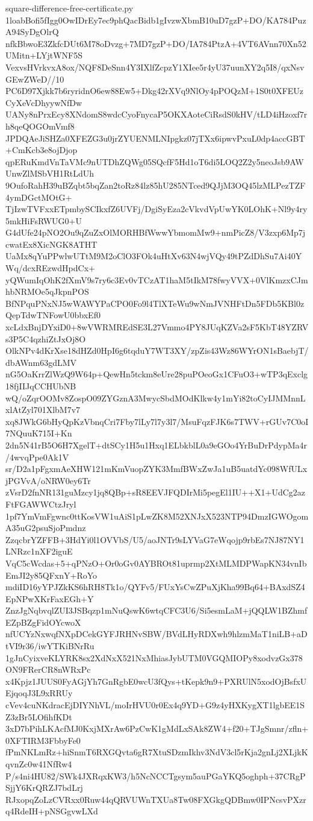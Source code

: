 \documentclass[11pt]{article}
\theoremstyle{definition}
\theoremstyle{remark}
\begin{document}
\begin{filecontents*}[overwrite]{square-difference-free-certificate.py}
1loabBofi5fIgg0OwIDrEy7ec9phQacBidb1gIvzwXbmB10uD7gzP+DO/KA784PuzA94SyDgOlrQ
nfkBbwoE3ZkfcDUt6M78oDvzg+7MD7gzP+DO/IA784PtzA+4VT6AVnn70Xn52UMitn+LYjtWNF5S
VexvsHVrkvxA8ox/NQF8DeSnn4Y3IXlfZcpzY1XIee5r4yU37uunXY2q5I8/qxNsvGEwZWeD//10
PC6D97Xjkk7b6ryridnO6ew88Ew5+Dkg42rXVq9NlOy4pPOQzM+1S0t0XFEUzCyXeVcDhyywNfDw
UANy8nPrxEcy8XNdomS8wdcCyoFnycaP5OKXAoteCiRsdS0kHV/tLD4iHzoxf7rh8qeQOGOmVmf8
JPDQAeJiSHZa0XFEZG3u0jrZYUENMLNIpgkz07jTXx6ipwvPxuL0dp4accGBT+CmKcb3e8ojDjop
qpERuKmdVnTaVMc9nUTDhZQWg05SQcfF5Hd1oT6di5LOQ2Z2y5neoJsb9AWUnwZlMSbVH1RtLdUh
9OufoRahH39uBZqbt5bqZan2toRz84lz85hU285NTced9QJjM3OQ45lzMLPezTZF4ymDGctMOtG+
TjIzwTVFxxETpmbySCIkxfZ6UVFj/DgiSyEza2cVkvdVpUwYK0LOhK+Nl9y4ry5mkHiFsRWUG0+U
G4dUfe24pNO2Ou9qZuZxOlMORHBfWwwYbmomMw9+nmPicZ8/V3zxp6Mp7jcwatEx8XicNGK8ATHT
UaMx8qYuPPwlwUTtM9M2oClO3FOk4uHtXv63N4wjVQy49tPZdDhSu7Ai40YWq/dcxREzwdHpdCx+
yQWumIqOhK2fXmV9s7ry6c3Ev0vTCzAT1haM5tIkM78fwyVVX+0VlKmzxCJmhbNRMOe5qJkpnPOS
BfNPquPNxNJ5wWAWYPaCPO0Fo9l4TlXTeWu9wNmJVNHFtDn5FDb5KBl0zQepTdwTNFowU0bbxEf0
xcLdxBnjDYxiD0+8wVWRMREdSE3L27Vmmo4PY8JUqKZVa2sF5KbT48YZRVs3P5C4qzhiZtJxOj8O
OlkNPv4dKrXse18dHZd0HpI6g6tqduY7WT3XY/zpZis43Wz86WYrON1sBaebjT/dbAWnm63gdLMV
nG5OaKrrZlWzQ9W64p+QewHn5tckm8eUre28puPOeoGx1CFuO3+wTP3qExclg18fjIIJqCCHUbNB
wQ/oZqrOOMv8ZospO09ZYGznA3MwycSbdMOdKlkw4y1mYi82toCyIJMMnnLxlAtZyl701XlbM7v7
xq8JWkG6bHyQpKzVbnqCri7Fby7lLy7l7y3l7/MsuFqzFJK6s7TWV+rGUv7C0oI7NQuuK715I+Kn
2dn5N41rB5O6H7XgelT+dtSCy1H5u1Hxq1ELbkblL0a9eGOo4YrBuDrPdypMa4r/4wvqPpe0Ak1V
sr/D2a1pFgxmAeXHW121mKmVuopZYK3MmfBWxZwJa1uB5uatdYc098WfULxjPGVvA/oNRW0ey6Tr
zVsrD2fnNR131guMzcy1jq8QBp+sR8EEVJFQDIrMi5pegEl1IU++X1+UdCg2azFtFGAWWCtzJryl
1pf7YmVmFgwnc0ttKosVW1uAiS1pLwZK8M52XNJxX523NTP94DmzIGWOgomA35uG2psuSjoPmdnz
ZzqcbrYZFFB+3HdYi0l1OVVbS/U5/aoJNTr9sLYVaG7eWqojp9rbEs7NJ87NY1LNRzc1nXF2iguE
VqC5cWcdas+5+qPNzO+Or0oGv0AYBROt81uprmp2XtMLMDPWapKN34vnIbEmJI2y85QFxnY+RoYo
mdiID16yYPJZkKS6hRH8Tk1o/QYFv5/FUxYsCwZPuXjKha99Bq64+BAxdSZ4EpNPwXKrFaxEGh+Y
ZnzJgNqbvqlZUI3JSBqzp1mNuQswK6wtqCFC3U6/Si5esmLaM+jQQLW1BZhmfEZpBZgFidOYcwoX
nfUCYzNxwqfNXpDCekGYFJRHNvSBW/BVdLHyRDXwh9hlzmMaT1niLB+aDtVI9r36/iwYTKiBNrRu
1gJnCyixveKLYRK8sx2XdNxX521NxMhiasJybUTM0VGQMIOPy8xodvzGx378ON9FRerCR8nWRxPc
x4Kpjz1JUUS0FyAGjYh7GnRgbE0wcU3fQys+tKepk9n9+PXRUlN5xodOjBsfxUEjqoqJ3L9xRRUy
cVev4cuNKdracEjDIYNhVL/moIrHVU0r0Ex4q9YD+G9z4yHXKygXT1lgbEE1SZ3zBr5LOfihfKDt
3xD7bPihLKAcfMJ0KxjMXrAw6PzCwK1gMdLxSAk8ZW4+f20+TJgSmnr/zfln+0XFTIRM3FbbyFe0
fPmNKLmRz+hiSnmT6RXGQvta6gR7XtuSDzmIkhv3NdV3cl5rKja2gnLj2XLjkKqvnZc0w41NfRw4
P/s4ni4HU82/SWk4JXRqxKW3/h5NcNCCTgsym5auPGaYKQ5oghph+37CRgPSjjY6KrQRZJ7bdLrj
RJxopqZoLzCVRxx0Ruw44qQRVUWnTXUa8Tw08FXGkgQDBmw0IPNcsvPXzrq4RdeIH+pNSGgvwLXd

\end{filecontents*}
\end{document}
